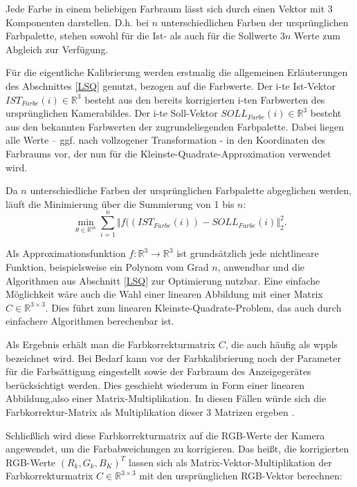 {Jede Farbe in einem beliebigen Farbraum lässt sich durch einen Vektor mit 3 Komponenten darstellen. 
D.h. bei $n$ unterschiedlichen Farben der ursprünglichen Farbpalette, 
stehen sowohl für die Ist- als auch für die Sollwerte $3n$ Werte zum Abgleich zur Verfügung.

Für die eigentliche Kalibrierung werden erstmalig die allgemeinen \linebreak Erläuterungen 
des Abschnittes \ref{LSQ} genutzt, bezogen auf die Farbwerte.
Der i-te Ist-Vektor $ IST_{Farbe}(i) \in \mathbb{R}^3$ besteht 
aus den bereits korrigierten i-ten Farbwerten des ursprünglichen Kamerabildes. 
Der i-te Soll-Vektor $ SOLL_{Farbe}(i) \in \mathbb{R}^3$ besteht 
aus den bekannten Farbwerten der zugrunde\-liegenden Farbpalette. 
Dabei liegen alle Werte – ggf. nach vollzogener Transformation 
- in den Koordinaten des Farbraums vor, 
der nun für die Kleinste-Quadrate-Approximation verwendet wird. 

Da $n$ unterschiedliche Farben der ursprünglichen Farbpalette abgeglichen werden, 
läuft die Minimierung über die Summierung von 1 bis $n$:
\[
\min_{\theta\in \mathbb{R}^m}  \sum_{i=1}^n \Vert f( (IST_{Farbe}(i)) - SOLL_{Farbe}(i) \Vert_2^2.
\]

Als Approximationsfunktion $f:\mathbb{R}^{3} \rightarrow \mathbb{R}^3$ ist grundsätzlich jede nichtlineare
Funktion, beispielsweise ein Polynom vom Grad $n$, anwendbar \cite{Kuerten:2008} und die
Algorithmen aus Abschnitt \ref{LSQ} zur Optimierung nutzbar.
Eine einfache Möglichkeit wäre auch die Wahl einer linearen Abbildung mit einer Matrix $C \in \mathbb{R}^{3 \times 3}$.
Dies führt zum linearen Kleinste-Quadrate-\-Problem,
das auch durch einfachere Algorithmen berechenbar ist.

Als Ergebnis erhält man die Farbkorrekturmatrix $C$, die auch häufig als \ac{wppls} bezeichnet wird. Bei Bedarf kann vor der Farbkalibrierung noch der Parameter für die Farb\-sättigung eingestellt sowie der Farbraum des Anzeigegerätes berücksichtigt werden. Dies geschieht wiederum in Form einer linearen Abbildung,also einer Matrix-Multiplikation. In diesen Fällen würde sich die Farbkorrektur-Matrix als Multiplikation dieser 3 Matrizen ergeben 
\cite{Balluff:2024}.

Schließlich wird diese Farbkorrekturmatrix auf die RGB-Werte der Kamera angewendet, um die Farbabweichungen zu korrigieren. Das heißt, die korrigierten RGB-Werte $(R_k, G_k, B_K)^T$ lassen sich  als Matrix-Vektor-\linebreak Multiplikation der Farbkorrekturmatrix $C \in \mathbb{R}^{3 \times 3}$ mit den ursprünglichen RGB-Vektor berechnen: 

}
